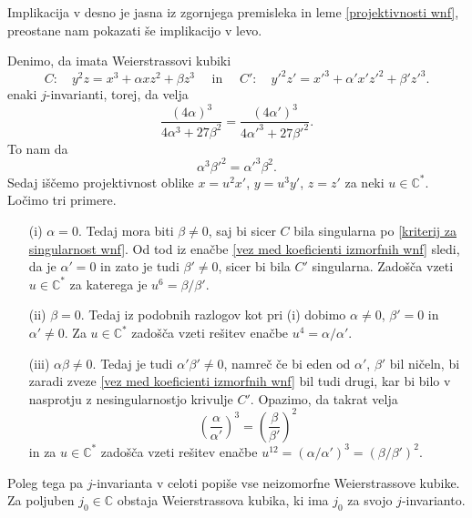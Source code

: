 \documentclass[mat1]{fmfdelo}
\numberwithin{equation}{section}
\newcommand{\C}{\mathbb C}
\newcommand{\CM}{\mathbb C ^*}
\theoremstyle{definition}
\begin{document}
\begin{dokaz}
    Implikacija v desno je jasna iz zgornjega premisleka in leme \ref{projektivnosti wnf}, preostane nam pokazati še implikacijo v levo. 

    Denimo, da imata Weierstrassovi kubiki
    \[
        C: \quad y^2z = x^3 + \alpha xz^2 + \beta z^3 \quad \text{ in } \quad
        C': \quad y'^2z' = x'^3 + \alpha' x'z'^2 + \beta' z'^3. 
    \]
    enaki $j$-invarianti, torej, da velja
    \[
        \frac{(4\alpha)^3}{4\alpha^3 + 27\beta^2} = \frac{(4\alpha')^3}{4\alpha'^3 + 27\beta'^2}.
    \]
    To nam da
    \begin{equation}
        \label{vez med koeficienti izmorfnih wnf}
        \alpha^3 \beta'^2 = \alpha'^3 \beta^2.
    \end{equation}
    Sedaj iščemo projektivnost oblike $x = u^2 x'$, $y = u^3 y'$, $z = z'$ za neki $u \in \CM$. Ločimo tri primere.

    \begin{itemize}
        \item[(i)]
        $\alpha = 0$. Tedaj mora biti $\beta \neq 0$, saj bi sicer $C$ bila singularna po \ref{kriterij za singularnost wnf}. Od tod iz enačbe \eqref{vez med koeficienti izmorfnih wnf} sledi, da je $\alpha' = 0$ in zato je tudi $\beta' \neq 0$, sicer bi bila $C'$ singularna. Zadošča vzeti $u \in \CM$ za katerega je $u^6 = \beta/\beta'$.
        \item[(ii)]
        $\beta = 0$. Tedaj iz podobnih razlogov kot pri (i) dobimo $\alpha \neq 0$, $\beta' = 0$ in $\alpha' \neq 0$. Za $u \in \CM$ zadošča vzeti rešitev enačbe $u^4 = \alpha/\alpha'$.
        \item[(iii)]
        $\alpha\beta \neq 0$. Tedaj je tudi $\alpha'\beta' \neq 0$, namreč če bi eden od $\alpha'$, $\beta'$ bil ničeln, bi zaradi zveze \eqref{vez med koeficienti izmorfnih wnf} bil tudi drugi, kar bi bilo v nasprotju z nesingularnostjo krivulje $C'$. Opazimo, da takrat velja
        \[
            \left(\frac{\alpha}{\alpha'}\right)^3 = \left(\frac{\beta}{\beta'}\right)^2
        \]
        in za $u \in \CM$ zadošča vzeti rešitev enačbe $u^{12} = (\alpha/\alpha')^3 = (\beta/\beta')^2$. \qedhere
    \end{itemize}
\end{dokaz}

Poleg tega pa $j$-invarianta v celoti popiše vse neizomorfne Weierstrassove kubike. Za poljuben $j_0 \in \C$ obstaja Weierstrassova kubika, ki ima $j_0$ za svojo $j$-invarianto.
\end{document}
